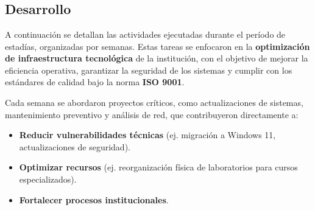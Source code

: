 \section{}
\setcounter{subsection}{2}
\subsection{Desarrollo}
A continuación se detallan las actividades ejecutadas durante el período de estadías, organizadas por semanas. Estas tareas se enfocaron en la \textbf{optimización de infraestructura tecnológica} de la institución, con el objetivo de mejorar la eficiencia operativa, garantizar la seguridad de los sistemas y cumplir con los estándares de calidad bajo la norma \textbf{ISO 9001}.  

Cada semana se abordaron proyectos críticos, como actualizaciones de sistemas, mantenimiento preventivo y análisis de red, que contribuyeron directamente a:  
\begin{itemize}
	\item \textbf{Reducir vulnerabilidades técnicas} (ej. migración a Windows 11, actualizaciones de seguridad).
	\item \textbf{Optimizar recursos} (ej. reorganización física de laboratorios para cursos especializados).
	\item \textbf{Fortalecer procesos institucionales}.
\end{itemize}

